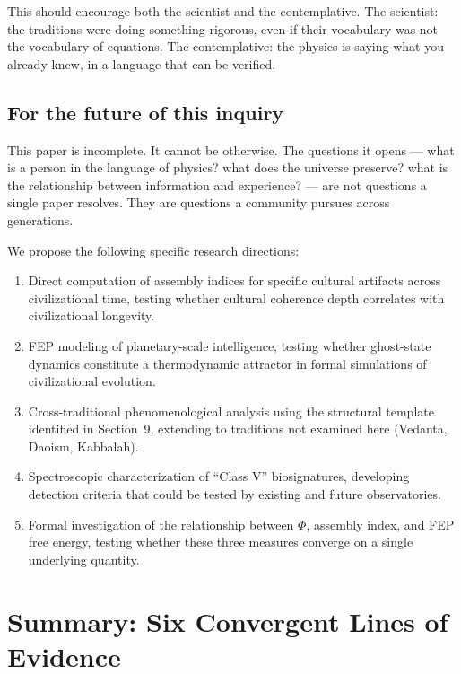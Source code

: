 \documentclass[12pt, a4paper]{article}
\begin{document}
This should encourage both the scientist and the contemplative. The scientist: the traditions
were doing something rigorous, even if their vocabulary was not the vocabulary of equations.
The contemplative: the physics is saying what you already knew, in a language that can be
verified.

\subsection{For the future of this inquiry}

This paper is incomplete. It cannot be otherwise. The questions it opens --- what is a
person in the language of physics? what does the universe preserve? what is the relationship
between information and experience? --- are not questions a single paper resolves. They are
questions a community pursues across generations.

We propose the following specific research directions:

\begin{enumerate}[itemsep=0.3em]
  \item Direct computation of assembly indices for specific cultural artifacts across
  civilizational time, testing whether cultural coherence depth correlates with civilizational
  longevity.
  \item FEP modeling of planetary-scale intelligence, testing whether ghost-state dynamics
  constitute a thermodynamic attractor in formal simulations of civilizational evolution.
  \item Cross-traditional phenomenological analysis using the structural template identified
  in Section~9, extending to traditions not examined here (Vedanta, Daoism, Kabbalah).
  \item Spectroscopic characterization of ``Class V'' biosignatures, developing detection
  criteria that could be tested by existing and future observatories.
  \pagebreak[4]
  \item Formal investigation of the relationship between $\Phi$, assembly index, and
  FEP free energy, testing whether these three measures converge on a single underlying
  quantity.
\end{enumerate}

\newpage
\section*{Summary: Six Convergent Lines of Evidence}
\end{document}
